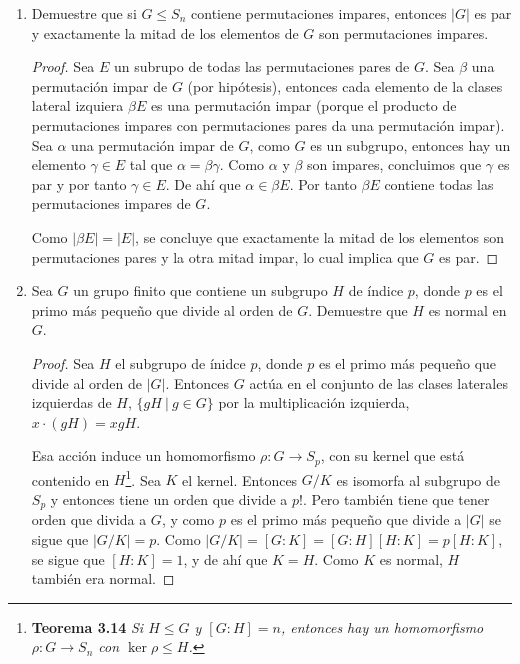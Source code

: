 \documentclass[letterpaper]{article}
\begin{document}
\begin{enumerate}

\item Demuestre que si $G \leq S_n$ contiene permutaciones impares, entonces $|G|$ es par y exactamente la
mitad de los elementos de $G$ son permutaciones impares.
\begin{proof}
Sea $E$ un subrupo de todas las permutaciones pares de $G$. Sea $\beta$ una permutación impar de $G$
(por hipótesis), entonces cada elemento de la clases lateral izquiera $\beta E$ es una permutación impar
(porque el producto de permutaciones impares con permutaciones pares da una permutación impar). Sea
$\alpha$ una permutación impar de $G$, como $G$ es un subgrupo, entonces hay un elemento $\gamma \in E$ tal
que $\alpha = \beta \gamma$. Como $\alpha$ y $\beta$ son impares, concluimos que $\gamma$ es par y por tanto
$\gamma \in E$.
De ahí que $\alpha \in \beta E$. Por tanto $\beta E$ contiene todas las permutaciones impares de $G$.

Como $|\beta E| = |E|$, se concluye que exactamente la mitad de los elementos son permutaciones pares
y la otra mitad impar, lo cual implica que $G$ es par.
\end{proof}

\item Sea $G$ un grupo finito que contiene un subgrupo $H$ de índice $p$, donde $p$ es el primo más pequeño
que divide al orden de $G$. Demuestre que $H$ es normal en $G$.
\begin{proof}
Sea $H$ el subgrupo de ínidce $p$, donde $p$ es el primo más pequeño que divide al orden de $|G|$. Entonces
$G$ actúa en el conjunto de las clases laterales izquierdas de $H$, $\{ gH \ | \ g \in G \}$ por la
multiplicación izquierda, $x \cdot (gH) = xgH$.

Esa acción induce un homomorfismo $\rho : G \to S_p$, con su kernel que está contenido en $H$\footnote{
    \textbf{Teorema 3.14} \emph{Si $H \leq G$ y $[G:H] = n$, entonces hay un homomorfismo $\rho : G \to S_n$
    con $\ker \rho \leq H$.}
}. Sea $K$ el kernel. Entonces $G/K$ es isomorfa al subgrupo de $S_p$ y entonces tiene un orden que divide
a $p!$. Pero también tiene que tener orden que divida a $G$, y como $p$ es el primo más pequeño que divide
a $|G|$ se sigue que $|G/K| = p$. Como $|G/K| = [G:K] = [G:H][H:K] = p[H:K]$, se sigue que $[H:K] = 1$, 
y de ahí que $K = H$. Como $K$ es normal, $H$ también era normal.
\end{proof}


\end{enumerate}
\end{document}
